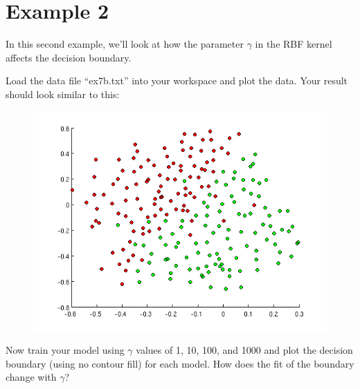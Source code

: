 \documentclass[10pt,a4paper]{article}
\begin{document}
\section{Example 2}
%
  In this second example, we'll look at how the parameter  $\gamma$ in the RBF kernel affects the decision boundary.

  Load the data file ``ex7b.txt'' into your workspace and plot the data. Your result should look similar to this:
  \begin{figure}[htb!]
    \centering
      \includegraphics[width=.7\columnwidth]{ex8b_dataonly}
  \end{figure}
  Now train your model using $\gamma$ values of 1, 10, 100, and 1000 and plot the decision boundary (using no contour fill) for each model. How does the fit of the boundary change with $\gamma$?
\end{document}
